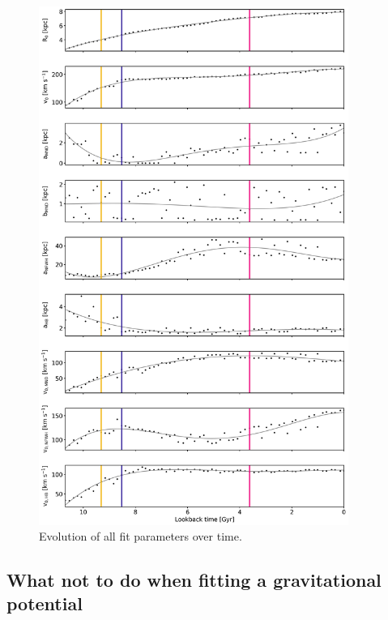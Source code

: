 \begin{figure}[htbp]
\centering
	\includegraphics[width=0.9\textwidth]{plots/Auriga/fitted_potential_evolution_dec18.png}
	\caption{Evolution of all fit parameters over time.}
	\label{fig:pot_val_evol}
\end{figure}

\subsection{What not to do when fitting a gravitational potential}\label{subsec:wrong_pot_fit}





